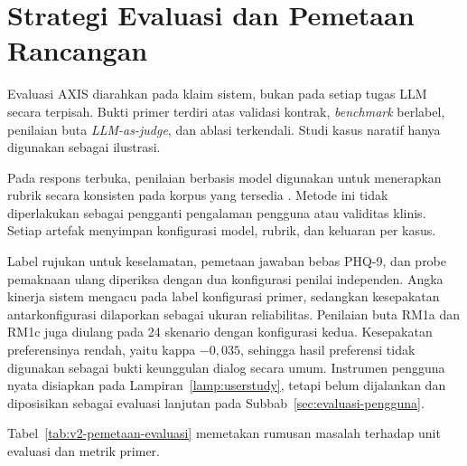\section{Strategi Evaluasi dan Pemetaan Rancangan}
\label{sec:evaluasi}

Evaluasi AXIS diarahkan pada klaim sistem, bukan pada setiap tugas LLM secara terpisah. Bukti primer terdiri atas validasi kontrak, \textit{benchmark} berlabel, penilaian buta \textit{LLM-as-judge}, dan ablasi terkendali. Studi kasus naratif hanya digunakan sebagai ilustrasi.

Pada respons terbuka, penilaian berbasis model digunakan untuk menerapkan rubrik secara konsisten pada korpus yang tersedia \parencite{liu2023geval,zheng2023judging}. Metode ini tidak diperlakukan sebagai pengganti pengalaman pengguna atau validitas klinis. Setiap artefak menyimpan konfigurasi model, rubrik, dan keluaran per kasus.

Label rujukan untuk keselamatan, pemetaan jawaban bebas PHQ-9, dan probe pemaknaan ulang diperiksa dengan dua konfigurasi penilai independen. Angka kinerja sistem mengacu pada label konfigurasi primer, sedangkan kesepakatan antarkonfigurasi dilaporkan sebagai ukuran reliabilitas. Penilaian buta RM1a dan RM1c juga diulang pada 24 skenario dengan konfigurasi kedua. Kesepakatan preferensinya rendah, yaitu kappa $-0,035$, sehingga hasil preferensi tidak digunakan sebagai bukti keunggulan dialog secara umum. Instrumen pengguna nyata disiapkan pada Lampiran~\ref{lamp:userstudy}, tetapi belum dijalankan dan diposisikan sebagai evaluasi lanjutan pada Subbab~\ref{sec:evaluasi-pengguna}.

Tabel~\ref{tab:v2-pemetaan-evaluasi} memetakan rumusan masalah terhadap unit evaluasi dan metrik primer.

